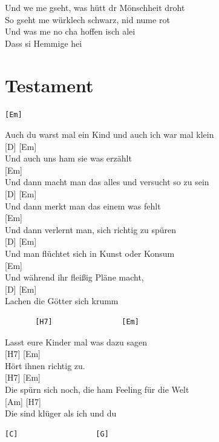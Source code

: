 \documentclass[
  letterpaper,
]{scrbook}
\begin{document}
Und we me gseht, was hütt dr Mönschheit droht\\
So gseht me würklech schwarz, nid nume rot\\
Und was me no cha hoffen isch alei\\
Dass si Hemmige hei

\hypertarget{testament}{%
\chapter{Testament}\label{testament}}

\begin{verbatim}
[Em]
\end{verbatim}

Auch du warst mal ein Kind und auch ich war mal klein\\
{[}D{]} {[}Em{]}\\
Und auch uns ham sie was erzählt\\
{[}Em{]}\\
Und dann macht man das alles und versucht so zu sein\\
{[}D{]} {[}Em{]}\\
Und dann merkt man das einem was fehlt\\
{[}Em{]}\\
Und dann verlernt man, sich richtig zu spüren\\
{[}D{]} {[}Em{]}\\
Und man flüchtet sich in Kunst oder Konsum\\
{[}Em{]}\\
Und während ihr fleißig Pläne macht,\\
{[}D{]} {[}Em{]}\\
Lachen die Götter sich krumm

\begin{verbatim}
       [H7]                [Em]
\end{verbatim}

Lasst eure Kinder mal was dazu sagen\\
{[}H7{]} {[}Em{]}\\
Hört ihnen richtig zu.\\
{[}H7{]} {[}Em{]}\\
Die spürn sich noch, die ham Feeling für die Welt\\
{[}Am{]} {[}H7{]}\\
Die sind klüger als ich und du

\begin{verbatim}
[C]                  [G]
\end{verbatim}
\end{document}
